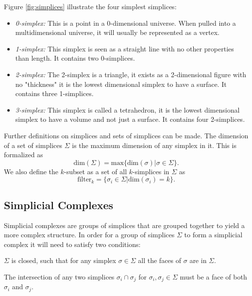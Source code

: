 Figure \ref{fig:simplices} illustrate the four simplest simplices:
\begin{itemize}
  \item \textit{0-simplex:} This is a point in a 0-dimensional universe. When
    pulled into a multidimensional universe, it will usually be represented as a
    vertex.

  \item \textit{1-simplex:} This simplex is seen as a straight line with no
    other properties than length. It contains two 0-simplices.

  \item \textit{2-simplex:} The 2-simplex is a triangle, it exists as a
    2-dimensional figure with no "thickness" it is the lowest dimensional
    simplex to have a surface. It contains three 1-simplices.

  \item \textit{3-simplex:} This simplex is called a tetrahedron, it is the
    lowest dimensional simplex to have a volume and not just a surface. It
    contains four 2-simplices.
\end{itemize}




Further definitions on simplices and sets of simplices can be made.
The dimension of a set of simplices $\Sigma$ is the maximum dimension of any
simplex in it. This is formalized as
\[
    \text{dim}(\Sigma) = \text{max}\{\text{dim}(\sigma) | \sigma \in \Sigma \}.
\]
We also define the $k$-subset as a set of all $k$-simplices in $\Sigma$ as
\[
    \text{filter}_k = \{\sigma_i \in \Sigma | \text{dim}(\sigma_i) = k\}.
\]

\subsection{Simplicial Complexes}
Simplicial complexes are groups of simplices that are grouped together to yield
a more complex structure. In order for a group of simplices $\Sigma$ to form a
simplicial complex it will need to satisfy two conditions:
\begin{enumerate*}
    \item $\Sigma$ is closed, such that for any simplex $\sigma \in
          \Sigma$ all the faces of $\sigma$ are in $\Sigma$.

    \item The intersection of any two simplices $\sigma_i \cap
          \sigma_j$ for $\sigma_i,\sigma_j \in \Sigma$ must be a face of both
          $\sigma_i$ and $\sigma_j$.
\end{enumerate*}

